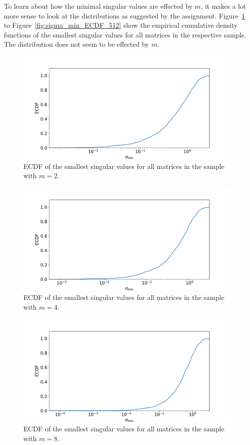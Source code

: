 \documentclass[a4paper, 11pt]{article}
\begin{document}
To learn about how the minimal singular values are effected by $m$, it makes a
lot more sense to look at the distributions as suggested by the assignment.
Figure~\ref{fig:sigma_min_ECDF_2} to Figure~\ref{fig:sigma_min_ECDF_512} show
the empirical cumulative density functions of the smallest singular values for
all matrices in the respective sample. The distribution does not seem to be
effected by $m$.

\begin{figure}
  \centering
  \includegraphics[width=\textwidth]{../2/square_ecdf/2.pdf}
  \caption{ECDF of the smallest singular values for all matrices in the sample with $m=2$.}
  \label{fig:sigma_min_ECDF_2}
\end{figure}
\begin{figure}
  \centering
  \includegraphics[width=\textwidth]{../2/square_ecdf/4.pdf}
  \caption{ECDF of the smallest singular values for all matrices in the sample with $m=4$.}
  \label{fig:sigma_min_ECDF_4}
\end{figure}
\begin{figure}
  \centering
  \includegraphics[width=\textwidth]{../2/square_ecdf/8.pdf}
  \caption{ECDF of the smallest singular values for all matrices in the sample with $m=8$.}
  \label{fig:sigma_min_ECDF_8}
\end{figure}
\end{document}

